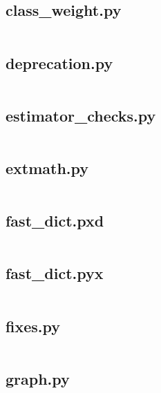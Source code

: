 \documentclass{article}
\begin{document}
\subsection{class\_weight.py}
\inputminted{python}{/home/dufferzafar/dev/@clones/scikit-learn/sklearn/utils/class_weight.py}
\newpage

\subsection{deprecation.py}
\inputminted{python}{/home/dufferzafar/dev/@clones/scikit-learn/sklearn/utils/deprecation.py}
\newpage

\subsection{estimator\_checks.py}
\inputminted{python}{/home/dufferzafar/dev/@clones/scikit-learn/sklearn/utils/estimator_checks.py}
\newpage

\subsection{extmath.py}
\inputminted{python}{/home/dufferzafar/dev/@clones/scikit-learn/sklearn/utils/extmath.py}
\newpage

\subsection{fast\_dict.pxd}
\inputminted{cython}{/home/dufferzafar/dev/@clones/scikit-learn/sklearn/utils/fast_dict.pxd}
\newpage

\subsection{fast\_dict.pyx}
\inputminted{cython}{/home/dufferzafar/dev/@clones/scikit-learn/sklearn/utils/fast_dict.pyx}
\newpage

\subsection{fixes.py}
\inputminted{python}{/home/dufferzafar/dev/@clones/scikit-learn/sklearn/utils/fixes.py}
\newpage

\subsection{graph.py}
\inputminted{python}{/home/dufferzafar/dev/@clones/scikit-learn/sklearn/utils/graph.py}
\newpage
\end{document}
